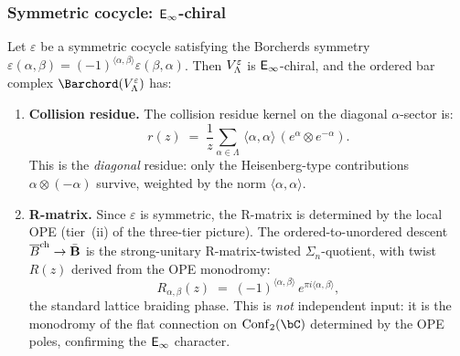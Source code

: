 \subsubsection{Symmetric cocycle: \texorpdfstring{$\mathsf{E}_{\infty}$}{E-infinity}-chiral}

\begin{theorem}
\label{thm:lattice-symmetric-ordered-bar}
Let $\varepsilon$ be a symmetric cocycle satisfying the Borcherds
symmetry $\varepsilon(\alpha,\beta) = (-1)^{\langle\alpha,\beta\rangle}
\varepsilon(\beta,\alpha)$. Then $V_\Lambda^\varepsilon$ is
$\mathsf{E}_{\infty}$-chiral, and the ordered bar complex
$\Barchord(\Vlat_\Lambda^\varepsilon)$ has:

\begin{enumerate}[label=\textup{(\arabic*)}]
\item \textbf{Collision residue.}
The collision residue kernel on the diagonal $\alpha$-sector is:
\begin{equation}\label{eq:lattice-symmetric-residue}
r(z) \;=\; \frac{1}{z}\sum_{\alpha \in \Lambda}\,
 \langle\alpha,\alpha\rangle\,
 (e^\alpha \otimes e^{-\alpha}).
\end{equation}
This is the \emph{diagonal} residue: only the Heisenberg-type
contributions $\alpha \otimes (-\alpha)$ survive, weighted by the norm
$\langle\alpha,\alpha\rangle$.

\item \textbf{R-matrix.}
Since $\varepsilon$ is symmetric, the R-matrix is
determined by the local OPE \textup{(}tier~(ii) of the three-tier
picture\textup{)}.
The ordered-to-unordered descent
$\overline{B}^{\mathrm{ch}} \to \bar{\mathbf{B}}$
is the strong-unitary R-matrix-twisted $\Sigma_n$-quotient, with twist
$R(z)$ derived from the OPE monodromy:
\begin{equation}\label{eq:lattice-symmetric-rmatrix}
R_{\alpha,\beta}(z) \;=\;
 (-1)^{\langle\alpha,\beta\rangle}\,
 e^{\pi i\langle\alpha,\beta\rangle},
\end{equation}
the standard lattice braiding phase. This is \emph{not} independent
input: it is the monodromy of the flat connection on
$\operatorname{Conf}_2(\bC)$ determined by the OPE poles,
confirming the $\mathsf{E}_{\infty}$ character.
\end{enumerate}
\end{theorem}

